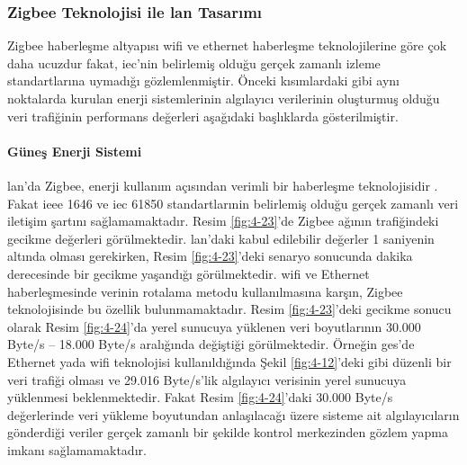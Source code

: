 \newpage
\subsubsection{Zigbee Teknolojisi ile \gls{lan} Tasarımı}\label{zigbee}


Zigbee haberleşme altyapısı \gls{wifi} ve ethernet haberleşme teknolojilerine göre çok daha ucuzdur fakat, \gls{iec}'nin belirlemiş olduğu gerçek zamanlı izleme standartlarına uymadığı gözlemlenmiştir. Önceki kısımlardaki gibi aynı noktalarda kurulan enerji sistemlerinin algılayıcı verilerinin oluşturmuş olduğu veri trafiğinin performans değerleri aşağıdaki başlıklarda gösterilmiştir.


\paragraph{Güneş Enerji Sistemi}\label{zigbeeges112}

\gls{lan}'da Zigbee, enerji kullanım açısından verimli bir haberleşme teknolojisidir \cite{alliance2010zigbee}.
Fakat \gls{ieee} 1646 ve \gls{iec} 61850 standartlarınin belirlemiş olduğu gerçek zamanlı veri iletişim şartını sağlamamaktadır.
Resim \ref{fig:4-23}'de Zigbee ağının trafiğindeki gecikme değerleri görülmektedir. \gls{lan}'daki kabul edilebilir değerler 1 saniyenin altında olması gerekirken, Resim \ref{fig:4-23}'deki senaryo sonucunda dakika derecesinde bir gecikme yaşandığı görülmektedir. \gls{wifi} ve Ethernet haberleşmesinde verinin rotalama metodu kullanılmasına karşın, Zigbee teknolojisinde bu özellik bulunmamaktadır. Resim \ref{fig:4-23}'deki gecikme sonucu olarak Resim \ref{fig:4-24}'da yerel sunucuya yüklenen veri boyutlarının 30.000 Byte/s -- 18.000 Byte/s aralığında değiştiği görülmektedir. Örneğin \gls{ges}'de Ethernet yada \gls{wifi} teknolojisi kullanıldığında Şekil \ref{fig:4-12}'deki gibi düzenli bir veri trafiği olması ve 29.016 Byte/s'lik algılayıcı verisinin yerel sunucuya yüklenmesi beklenmektedir. Fakat Resim \ref{fig:4-24}'daki 30.000 Byte/s değerlerinde veri yükleme boyutundan anlaşılacağı üzere sisteme ait algılayıcıların gönderdiği veriler gerçek zamanlı bir şekilde kontrol merkezinden gözlem yapma imkanı sağlamamaktadır.


